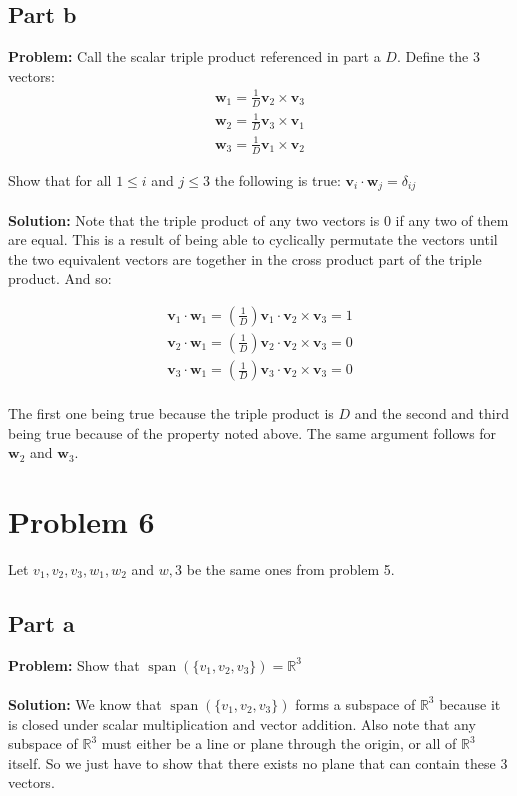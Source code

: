 \documentclass{article}
\begin{document}
\subsection{Part b}
\textbf{Problem:} Call the scalar triple product referenced in part a $D$. Define the 3 vectors:
\begin{gather*}
  \mathbf w_1=\frac{1}{D}\mathbf v_2\times\mathbf v_3\\
  \mathbf w_2=\frac{1}{D}\mathbf v_3\times\mathbf v_1\\
  \mathbf w_3=\frac{1}{D}\mathbf v_1\times\mathbf v_2
\end{gather*}

Show that for all $1\le i$ and $j\le 3$ the following is true: $\mathbf v_i\cdot\mathbf w_j=\delta_{ij}$
\\\\
\textbf{Solution:} Note that the triple product of any two vectors is $0$ if any two of them are equal. This is a result of being able to cyclically permutate the vectors until the two equivalent vectors are together in the cross product part of the triple product. And so:

\begin{gather*}
  \mathbf v_1\cdot\mathbf w_1=\left(\frac{1}{D}\right)\mathbf v_1\cdot\mathbf v_2\times\mathbf v_3=1\\
  \mathbf v_2\cdot\mathbf w_1=\left(\frac{1}{D}\right)\mathbf v_2\cdot\mathbf v_2\times\mathbf v_3=0\\
  \mathbf v_3\cdot\mathbf w_1=\left(\frac{1}{D}\right)\mathbf v_3\cdot\mathbf v_2\times\mathbf v_3=0\\
\end{gather*}

The first one being true because the triple product is $D$ and the second and third being true because of the property noted above. The same argument follows for $\mathbf w_2$ and $\mathbf w_3$.

\section{Problem 6}
Let $v_1,v_2,v_3,w_1,w_2$ and $w,3$ be the same ones from problem 5.
\subsection{Part a}
\textbf{Problem:} Show that $\operatorname{span}(\{v_1,v_2,v_3\})=\mathbb R^3$
\\\\
\textbf{Solution:} We know that $\operatorname{span}(\{v_1,v_2,v_3\})$ forms a subspace of $\mathbb R^3$ because it is closed under scalar multiplication and vector addition. Also note that any subspace of $\mathbb R^3$ must either be a line or plane through the origin, or all of $\mathbb R^3$ itself. So we just have to show that there exists no plane that can contain these 3 vectors.
\end{document}
